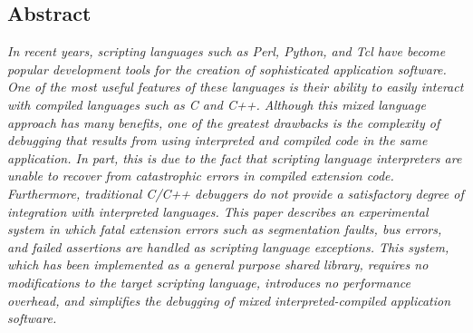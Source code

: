 \author{{David M.\ Beazley} \\
{\em Department of Computer Science} \\
{\em University of Chicago }\\
{\em Chicago, Illinois 60637 }\\
{\em beazley@cs.uchicago.edu }}

 

\maketitle

\thispagestyle{empty}


\subsection*{Abstract}
{\em
In recent years, scripting languages such as Perl, Python, and Tcl
have become popular development tools for the creation of
sophisticated application software.  One of the most useful features
of these languages is their ability to easily interact with compiled
languages such as C and C++.  Although this mixed language approach
has many benefits, one of the greatest drawbacks is the complexity of
debugging that results from using interpreted and compiled code in
the same application.  In part, this is due to the fact that scripting
language interpreters are unable to recover from catastrophic errors in
compiled extension code. Furthermore, traditional C/C++ debuggers do
not provide a satisfactory degree of integration with interpreted
languages.  This paper describes an experimental system in which fatal
extension errors such as segmentation faults, bus errors, and failed
assertions are handled as scripting language exceptions.  This system,
which has been implemented as a general purpose shared library,
requires no modifications to the target scripting language, introduces
no performance overhead, and simplifies the debugging of mixed
interpreted-compiled application software.
}

